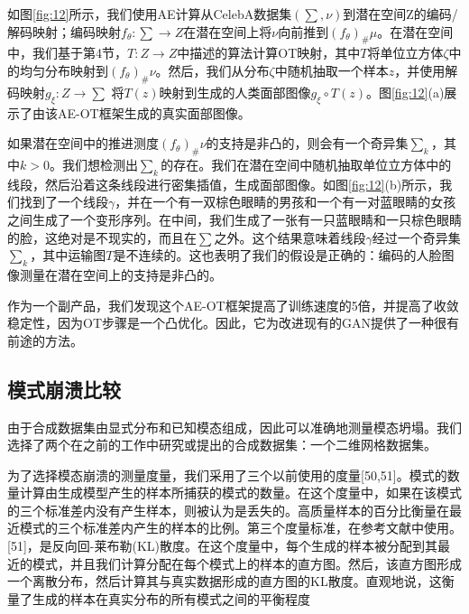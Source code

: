 如图\ref{fig:12}所示，我们使用AE计算从CelebA数据集$(\sum,\nu)$到潜在空间Z的编码/解码映射；编码映射$f_{\theta}: \sum \to Z$在潜在空间上将$\nu$向前推到$(f_{\theta})_{\#}\mu$。在潜在空间中，我们基于第4节，$T: Z\to Z$中描述的算法计算OT映射，其中$T$将单位立方体$\zeta$中的均匀分布映射到$(f_{\theta})_{\#}\nu$。然后，我们从分布$\zeta$中随机抽取一个样本$z$，并使用解码映射$g_{\xi}:Z\to \sum$ 将$T(z)$映射到生成的人类面部图像$g_{\xi} \circ T(z)$。图\ref{fig:12}(a)展示了由该AE-OT框架生成的真实面部图像。

如果潜在空间中的推进测度$(f_{\theta})_{\#} \nu$的支持是非凸的，则会有一个奇异集$\sum _k$，其中$k>0$。我们想检测出$\sum _k$的存在。我们在潜在空间中随机抽取单位立方体中的线段，然后沿着这条线段进行密集插值，生成面部图像。如图\ref{fig:12}(b)所示，我们找到了一个线段$\gamma$，并在一个有一双棕色眼睛的男孩和一个有一对蓝眼睛的女孩之间生成了一个变形序列。在中间，我们生成了一张有一只蓝眼睛和一只棕色眼睛的脸，这绝对是不现实的，而且在$\sum$之外。这个结果意味着线段$\gamma$经过一个奇异集$\sum _k$，其中运输图$T$是不连续的。这也表明了我们的假设是正确的：编码的人脸图像测量在潜在空间上的支持是非凸的。

作为一个副产品，我们发现这个AE-OT框架提高了训练速度的5倍，并提高了收敛稳定性，因为OT步骤是一个凸优化。因此，它为改进现有的GAN提供了一种很有前途的方法。

\subsection{模式崩溃比较}

由于合成数据集由显式分布和已知模态组成，因此可以准确地测量模态坍塌。我们选择了两个在之前的工作中研究或提出的合成数据集：一个二维网格数据集。

为了选择模态崩溃的测量度量，我们采用了三个以前使用的度量[50,51]。模式的数量计算由生成模型产生的样本所捕获的模式的数量。在这个度量中，如果在该模式的三个标准差内没有产生样本，则被认为是丢失的。高质量样本的百分比衡量在最近模式的三个标准差内产生的样本的比例。第三个度量标准，在参考文献中使用。[51]，是反向回-莱布勒(KL)散度。在这个度量中，每个生成的样本被分配到其最近的模式，并且我们计算分配在每个模式上的样本的直方图。然后，该直方图形成一个离散分布，然后计算其与真实数据形成的直方图的KL散度。直观地说，这衡量了生成的样本在真实分布的所有模式之间的平衡程度

